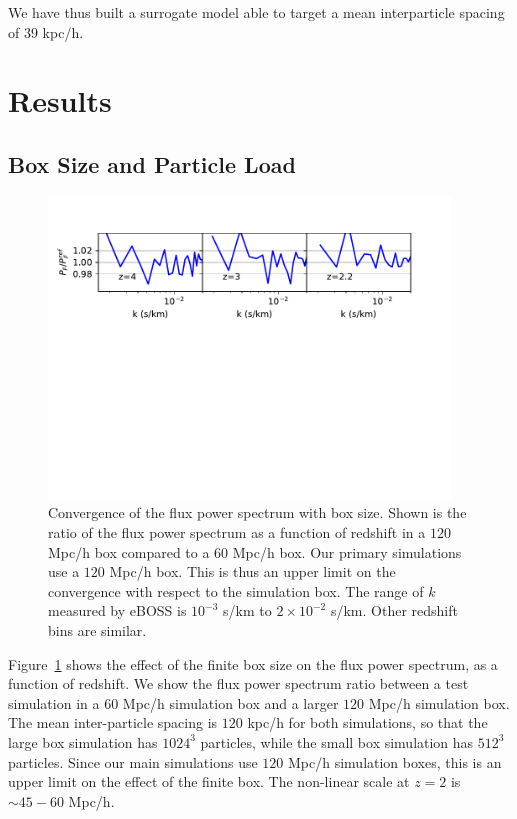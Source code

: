 \documentclass[a4paper,11pt]{article}
\newcommand{\Lya}{Lyman-$\alpha$}
\begin{document}
We have thus built a surrogate model able to target a mean interparticle spacing of $39$ kpc/h.

\section{Results}

\subsection{Box Size and Particle Load}
\label{sec:boxsize}

\begin{figure}
\includegraphics[width=0.95\textwidth,trim={0 7cm 1cm 0},clip]{figures/box-convergence.pdf}
 \caption{Convergence of the flux power spectrum with box size. Shown is the ratio of the flux power spectrum as a function of redshift in a $120$ Mpc/h box compared to a $60$ Mpc/h box. Our primary simulations use a $120$ Mpc/h box. This is thus an upper limit on the convergence with respect to the simulation box. The range of $k$ measured by eBOSS is $10^{-3}$ s/km to $2\times 10^{-2}$ s/km. Other redshift bins are similar.}
 \label{fig:boxsize}
\end{figure}

Figure~\ref{fig:boxsize} shows the effect of the finite box size on the flux power spectrum, as a function of redshift. We show the flux power spectrum ratio between a test simulation in a $60$ Mpc/h simulation box and a larger $120$ Mpc/h simulation box. The mean inter-particle spacing is $120$ kpc/h for both simulations, so that the large box simulation has $1024^3$ particles, while the small box simulation has $512^3$ particles. Since our main simulations use $120$ Mpc/h simulation boxes, this is an upper limit on the effect of the finite box. The non-linear scale at $z=2$ is $\sim 45 - 60$ Mpc/h.
\end{document}
